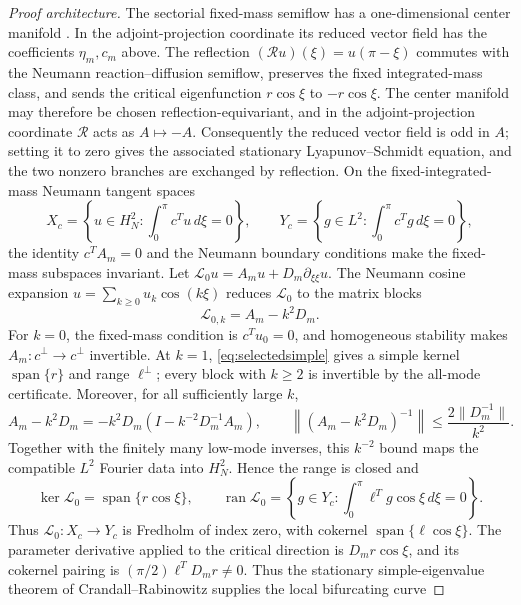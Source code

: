\documentclass[11pt]{article}
\theoremstyle{definition}
\newcommand{\1}{\mathbf 1}
\begin{document}
\begin{proof}[Proof architecture]
The sectorial fixed-mass semiflow has a one-dimensional center manifold
\cite[Chapter~6]{Henry1981}.  In the adjoint-projection coordinate its reduced
vector field has the coefficients $\eta_m,c_m$ above.  The reflection
$(\mathcal Ru)(\xi)=u(\pi-\xi)$ commutes with the Neumann
reaction--diffusion semiflow, preserves the fixed integrated-mass class, and
sends the critical eigenfunction $r\cos\xi$ to $-r\cos\xi$.  The center
manifold may therefore be chosen reflection-equivariant, and in the
adjoint-projection coordinate $\mathcal R$ acts as $A\mapsto-A$.  Consequently
the reduced vector field is odd in $A$; setting it to zero gives the associated
stationary Lyapunov--Schmidt equation, and the two nonzero branches are
exchanged by reflection.  On the fixed-integrated-mass Neumann tangent spaces
\[
 X_c=\left\{u\in H_N^2:\int_0^\pi c^Tu\,d\xi=0\right\},\qquad
 Y_c=\left\{g\in L^2:\int_0^\pi c^Tg\,d\xi=0\right\},
\]
the identity $c^TA_m=0$ and the Neumann boundary conditions make the
fixed-mass subspaces invariant.  Let
$\mathcal L_0u=A_mu+D_m\partial_{\xi\xi}u$.  The Neumann cosine expansion
$u=\sum_{k\ge0}u_k\cos(k\xi)$ reduces $\mathcal L_0$ to the matrix blocks
\begin{equation}\label{eq:fourier-fredholm}
 \mathcal L_{0,k}=A_m-k^2D_m.
\end{equation}
For $k=0$, the fixed-mass condition is $c^Tu_0=0$, and homogeneous stability
makes $A_m:c^\perp\to c^\perp$ invertible.  At $k=1$,
\eqref{eq:selectedsimple} gives a simple kernel $\operatorname{span}\{r\}$ and
range $\ell^\perp$; every block with $k\ge2$ is invertible by the all-mode
certificate.  Moreover, for all sufficiently large $k$,
\begin{equation}\label{eq:high-mode-inverse}
 A_m-k^2D_m=-k^2D_m
 \left(I-k^{-2}D_m^{-1}A_m\right),\qquad
 \left\|(A_m-k^2D_m)^{-1}\right\|
 \le \frac{2\|D_m^{-1}\|}{k^2}.
\end{equation}
Together with the finitely many low-mode inverses, this $k^{-2}$ bound maps
the compatible $L^2$ Fourier data into $H_N^2$.  Hence the range is closed and
\[
 \ker\mathcal L_0=\operatorname{span}\{r\cos\xi\},\qquad
 \operatorname{ran}\mathcal L_0
 =\left\{g\in Y_c:\int_0^\pi \ell^Tg\cos\xi\,d\xi=0\right\}.
\]
Thus $\mathcal L_0:X_c\to Y_c$ is Fredholm of index zero, with cokernel
$\operatorname{span}\{\ell\cos\xi\}$.  The parameter derivative applied to
the critical direction is $D_mr\cos\xi$, and its cokernel pairing is
$(\pi/2)\ell^TD_mr\ne0$.  Thus the stationary simple-eigenvalue theorem
of Crandall--Rabinowitz supplies the local bifurcating curve

\end{proof}
\end{document}
